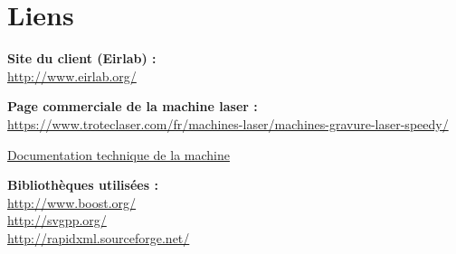 
\section{Liens}

\textbf{Site du client (Eirlab) :}\\
    \url{http://www.eirlab.org/}
    
\textbf{Page commerciale de la machine laser :}\\
    \url{https://www.troteclaser.com/fr/machines-laser/machines-gravure-laser-speedy/}
    
    \href{https://www.troteclaser.com/fileadmin/content/images/Laser_Machines/Speedy_Series/Documentation-famille-Speedy.pdf}{Documentation technique de la machine}
    
\textbf{Bibliothèques utilisées :}\\
 \url{http://www.boost.org/}\\
 \url{http://svgpp.org/}\\
 \url{http://rapidxml.sourceforge.net/}\\
